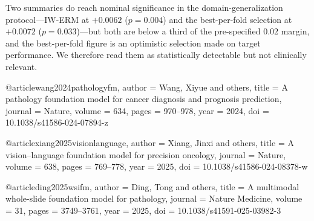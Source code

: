 Two summaries do reach nominal significance in the
domain-generalization protocol---IW-ERM at $+0.0062$ ($p=0.004$) and the
best-per-fold selection at $+0.0072$ ($p=0.033$)---but both are below a third of
the pre-specified $0.02$ margin, and the best-per-fold figure is an optimistic
selection made on target performance. We therefore read them as statistically
detectable but not clinically relevant.



@article{wang2024pathologyfm,
  author  = {Wang, Xiyue and others},
  title   = {A pathology foundation model for cancer diagnosis and prognosis
             prediction},
  journal = {Nature},
  volume  = {634},
  pages   = {970--978},
  year    = {2024},
  doi     = {10.1038/s41586-024-07894-z}
}

@article{xiang2025visionlanguage,
  author  = {Xiang, Jinxi and others},
  title   = {A vision--language foundation model for precision oncology},
  journal = {Nature},
  volume  = {638},
  pages   = {769--778},
  year    = {2025},
  doi     = {10.1038/s41586-024-08378-w}
}

@article{ding2025wsifm,
  author  = {Ding, Tong and others},
  title   = {A multimodal whole-slide foundation model for pathology},
  journal = {Nature Medicine},
  volume  = {31},
  pages   = {3749--3761},
  year    = {2025},
  doi     = {10.1038/s41591-025-03982-3}
}
